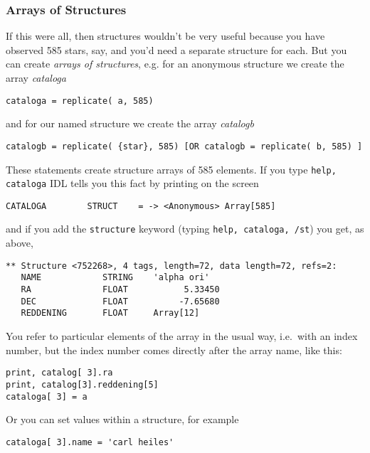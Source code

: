 \documentclass[psfig,preprint]{aastex}
\begin{document}
\subsubsection{Arrays of Structures}

	If this were all, then structures wouldn't be
very useful because you have observed 585 stars, say, and you'd need a
separate structure for each. But you can create {\it arrays of structures},
e.g. for an anonymous structure we create the array {\it cataloga}

\begin{verbatim}
cataloga = replicate( a, 585) 
\end{verbatim}

\noindent and for our named structure we create the array {\it catalogb}

\begin{verbatim}
catalogb = replicate( {star}, 585) [OR catalogb = replicate( b, 585) ]
\end{verbatim}

\noindent These statements create structure arrays of 585 elements.  If
you type {\tt help, cataloga} IDL tells you this fact by printing on the
screen

\noindent \verb$CATALOGA        STRUCT    = -> <Anonymous> Array[585]$

\noindent and if you add the {\tt structure} keyword (typing {\tt help,
cataloga, /st}) you get, as above, 

\begin{verbatim}
** Structure <752268>, 4 tags, length=72, data length=72, refs=2:
   NAME            STRING    'alpha ori'
   RA              FLOAT           5.33450
   DEC             FLOAT          -7.65680
   REDDENING       FLOAT     Array[12]
\end{verbatim}

\noindent You refer to particular elements of the array in the usual
way, i.e.\ with an index number, but the index number comes directly
after the array name, like this:

\begin{verbatim}
print, catalog[ 3].ra
print, catalog[3].reddening[5]
cataloga[ 3] = a
\end{verbatim}

\noindent Or you can set values within a structure, for example

\begin{verbatim}
cataloga[ 3].name = 'carl heiles'
\end{verbatim}
\end{document}
